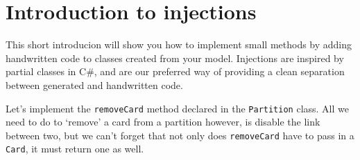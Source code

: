 \newpage
\section{Introduction to injections}
\genHeader
\hypertarget{sec:injections common}{}

This short introducion will show you how to implement small methods by adding handwritten code to classes created from your model. Injections are inspired by
partial classes in C\#, and are our preferred way of providing a clean separation between generated and handwritten code. 

Let's implement the \texttt{removeCard} method declared in the \texttt{Partition} class. All we need to do to `remove' a card from a partition however, is
disable the link between two, but we can't forget that not only does \texttt{removeCard} have to pass in a \texttt{Card}, it must return one as well.

